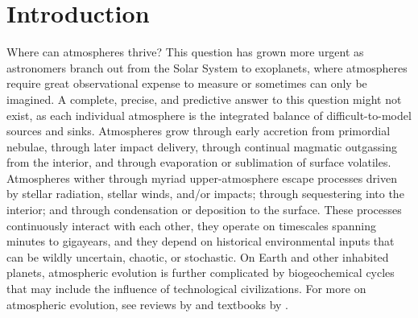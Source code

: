 \documentclass[modern,linenumbers,trackchanges]{aastex7}
\begin{document}


\section{Introduction} 
\label{s:introduction}

Where can atmospheres thrive? This question has grown more urgent as astronomers branch out from the Solar System to exoplanets, where atmospheres require great observational expense to measure or sometimes can only be imagined. A complete, precise, and predictive answer to this question might not exist, as each individual atmosphere is the integrated balance of difficult-to-model sources and sinks. Atmospheres grow through early accretion from primordial nebulae, through later impact delivery, through continual magmatic outgassing from the interior, and through evaporation or sublimation of surface volatiles. Atmospheres wither through myriad upper-atmosphere escape processes driven by stellar radiation, stellar winds, and/or impacts; through sequestering into the interior; and through condensation or deposition to the surface. These processes continuously interact with each other, they operate on timescales spanning minutes to gigayears, and they depend on historical environmental inputs that can be wildly uncertain, chaotic, or stochastic. On Earth and other inhabited planets, atmospheric evolution is further complicated by biogeochemical cycles that may include the influence of technological civilizations. For more on atmospheric evolution, see reviews by \citet{johnsonExospheresAtmosphericEscape2008, lammerAtmosphericEscapeEvolution2008, tianAtmosphericEscapeSolar2015b, owenAtmosphericEscapeEvolution2019a,  gronoffAtmosphericEscapeProcesses2020, wordsworthAtmospheresRockyExoplanets2022} and textbooks by \citet{chamberlainTheoryPlanetaryAtmospheres1987, pierrehumbertPrinciplesPlanetaryClimate2010, seagerExoplanetAtmospheresPhysical2010, ingersollPlanetaryClimates2013, lissauerFundamentalPlanetaryScience2019}.
 
\end{document}
